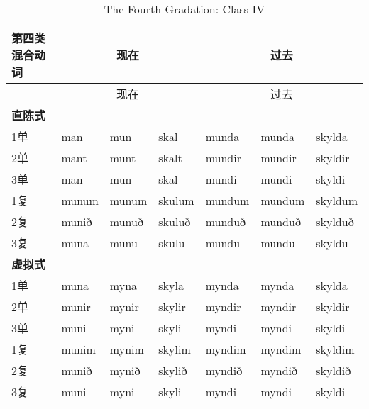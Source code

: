\begin{longtable}{lllllll}
  \caption[The Fourth Gradation: Class IV]{The Fourth Gradation: Class
    IV}\tabularnewline
  \toprule
  第四类混合动词  & \multicolumn{3}{c}{现在} & \multicolumn{3}{c}{过去}                                        \\\midrule\endfirsthead{} &\multicolumn{3}{c}{现在} &\multicolumn{3}{c}{过去} \\
  \midrule
  \endhead
  \bottomrule
  \endfoot
  \textbf{直陈式} & ~                        & ~                        & ~        & ~      & ~      & ~       \\
  1单             & man                      & mun                      & skal     & munda  & munda  & skylda  \\
  2单             & mant                     & munt                     & skalt    & mundir & mundir & skyldir \\
  3单             & man                      & mun                      & skal     & mundi  & mundi  & skyldi  \\
  1复             & munum                    & munum                    & skulum   & mundum & mundum & skyldum \\
  2复             & munið                    & munuð                    & skuluð   & munduð & munduð & skylduð \\
  3复             & muna                     & munu                     & skulu    & mundu  & mundu  & skyldu  \\
  \textbf{虚拟式} & ~                        & ~                        & ~        & ~      & ~      & ~       \\
  1单             & muna                     & myna                     & skyla    & mynda  & mynda  & skylda  \\
  2单             & munir                    & mynir                    & skylir   & myndir & myndir & skyldir \\
  3单             & muni                     & myni                     & skyli    & myndi  & myndi  & skyldi  \\
  1复             & munim                    & mynim                    & skylim   & myndim & myndim & skyldim \\
  2复             & munið                    & mynið                    & skylið   & myndið & myndið & skyldið \\
  3复             & muni                     & myni                     & skyli    & myndi  & myndi  & skyldi  \\

\end{longtable}
